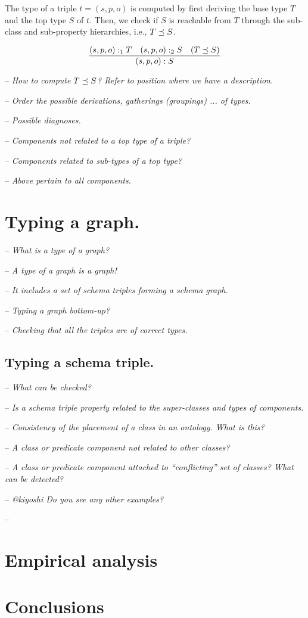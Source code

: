 \documentclass[runningheads]{llncs}
\newcommand{\nl}{\hfill\break}
\newcommand{\notes}[1]{\noindent\begin{small}-- \emph{#1}\\\end{small}}
\begin{document}
The type of a triple $t=(s,p,o)$ is computed by first deriving the
base type $T$ and the top type $S$ of $t$. Then, we check if $S$ is
reachable from $T$ through the sub-class and sub-property hierarchies,
i.e., $T\preceq\/S$.

\begin{equation}
\dfrac{(s,p,o):_1T\quad (s,p,o):_2S\quad (T\preceq\/S)}
      {(s,p,o):S}
\end{equation}

\medskip

\medskip
\notes{How to compute $T\preceq\/S$? Refer to position where we have a description.}
\notes{Order the possible derivations, gatherings (groupings) ... of types.}

\notes{Possible diagnoses.}
\notes{Components not related to a top type of a triple?}
\notes{Components related to sub-types of a top type?}
\notes{Above pertain to all components.}





\section{Typing a graph.}\nl

\notes{What is a type of a graph?}
\notes{A type of a graph is a graph!}
\notes{It includes a set of schema triples forming a schema graph.}

\notes{Typing a graph bottom-up?}
\notes{Checking that all the triples are of correct types.}


\subsection{Typing a schema triple.}\nl

\notes{What can be checked?}
\notes{Is a schema triple properly related to the super-classes and types of components.}
\notes{Consistency of the placement of a class in an ontology. What is this?}
\notes{A class or predicate component not related to other classes?}
\notes{A class or predicate component attached to ``conflicting'' set of classes? What can be detected?}
\notes{@kiyoshi Do you see any other examples?}
\notes{}





\section{Empirical analysis}




\section{Conclusions}



%



\end{document}
